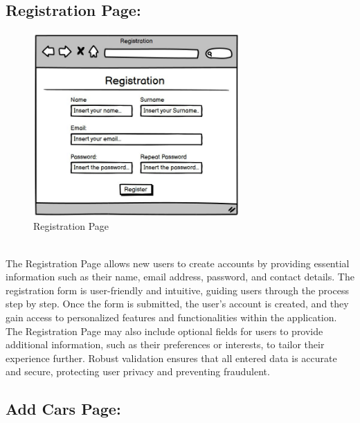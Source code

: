  \subsection{Registration Page: }


\begin{figure}[h]
\centering
\includegraphics[width=0.7\textwidth, inner]{sections/Registration.jpg}
\caption{Registration Page}
\end{figure}\\

The Registration Page allows new users to create accounts by providing essential information such as their name, email address, password, and contact details. The registration form is user-friendly and intuitive, guiding users through the process step by step. Once the form is submitted, the user's account is created, and they gain access to personalized features and functionalities within the application. The Registration Page may also include optional fields for users to provide additional information, such as their preferences or interests, to tailor their experience further. Robust validation ensures that all entered data is accurate and secure, protecting user privacy and preventing fraudulent.\newpage
 \subsection{Add Cars Page: }


